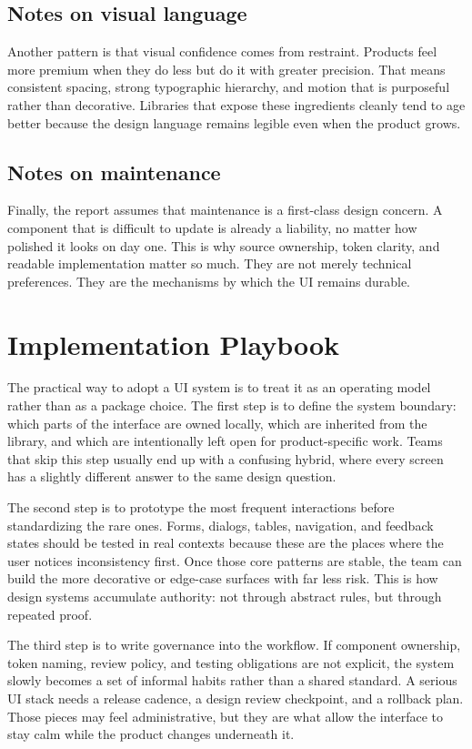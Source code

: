 \documentclass[11pt,twoside,a4paper]{article}
\begin{document}
\subsection{Notes on visual language}
Another pattern is that visual confidence comes from restraint. Products feel more premium when they do less but do it with greater precision. That means consistent spacing, strong typographic hierarchy, and motion that is purposeful rather than decorative. Libraries that expose these ingredients cleanly tend to age better because the design language remains legible even when the product grows.

\subsection{Notes on maintenance}
Finally, the report assumes that maintenance is a first-class design concern. A component that is difficult to update is already a liability, no matter how polished it looks on day one. This is why source ownership, token clarity, and readable implementation matter so much. They are not merely technical preferences. They are the mechanisms by which the UI remains durable.

\section{Implementation Playbook}
The practical way to adopt a UI system is to treat it as an operating model rather than as a package choice. The first step is to define the system boundary: which parts of the interface are owned locally, which are inherited from the library, and which are intentionally left open for product-specific work. Teams that skip this step usually end up with a confusing hybrid, where every screen has a slightly different answer to the same design question.

The second step is to prototype the most frequent interactions before standardizing the rare ones. Forms, dialogs, tables, navigation, and feedback states should be tested in real contexts because these are the places where the user notices inconsistency first. Once those core patterns are stable, the team can build the more decorative or edge-case surfaces with far less risk. This is how design systems accumulate authority: not through abstract rules, but through repeated proof.

The third step is to write governance into the workflow. If component ownership, token naming, review policy, and testing obligations are not explicit, the system slowly becomes a set of informal habits rather than a shared standard. A serious UI stack needs a release cadence, a design review checkpoint, and a rollback plan. Those pieces may feel administrative, but they are what allow the interface to stay calm while the product changes underneath it.
\end{document}
